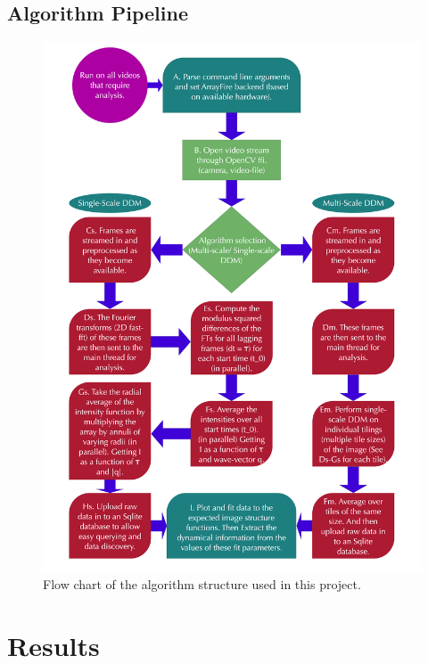 \documentclass[11pt]{article}
\begin{document}
\subsection{Algorithm Pipeline}
\begin{figure}[H]
\centering
\noindent \includegraphics[height=0.7\paperwidth, width=0.6\paperwidth]{images/algo-pipeline.png}
\caption{Flow chart of the algorithm structure used in this project.}
\end{figure}
 
\clearpage
\section{Results}
\label{section:results}
\end{document}
